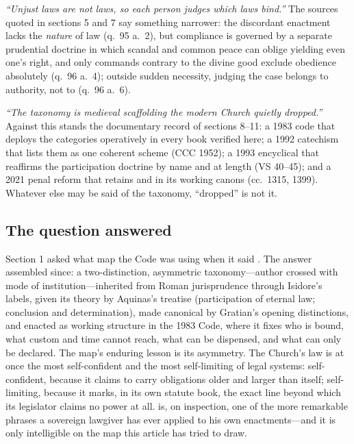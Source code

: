 \emph{``Unjust laws are not laws, so each person judges which laws bind.''} The sources quoted in sections 5 and 7 say something narrower: the discordant enactment lacks the \emph{nature} of law (q.~95 a.~2), but compliance is governed by a separate prudential doctrine in which scandal and common peace can oblige yielding even one's right, and only commands contrary to the divine good exclude obedience absolutely (q.~96 a.~4); outside sudden necessity, judging the case belongs to authority, not to  (q.~96 a.~6).

\emph{``The taxonomy is medieval scaffolding the modern Church quietly dropped.''} Against this stands the documentary record of sections 8--11: a 1983 code that deploys the categories operatively in every book verified here; a 1992 catechism that lists them as one coherent scheme (CCC 1952); a 1993 encyclical that reaffirms the participation doctrine by name and at length (VS 40--45); and a 2021 penal reform that retains  and  in its working canons (cc.~1315, 1399). Whatever else may be said of the taxonomy, ``dropped'' is not it.

\subsection{The question answered}

Section 1 asked what map the Code was using when it said . The answer assembled since: a two-distinction, asymmetric taxonomy---author crossed with mode of institution---inherited from Roman jurisprudence through Isidore's labels, given its theory by Aquinas's treatise (participation of eternal law; conclusion and determination), made canonical by Gratian's opening distinctions, and enacted as working structure in the 1983 Code, where it fixes who is bound, what custom and time cannot reach, what can be dispensed, and what can only be declared. The map's enduring lesson is its asymmetry. The Church's law is at once the most self-confident and the most self-limiting of legal systems: self-confident, because it claims to carry obligations older and larger than itself; self-limiting, because it marks, in its own statute book, the exact line beyond which its legislator claims no power at all.  is, on inspection, one of the more remarkable phrases a sovereign lawgiver has ever applied to his own enactments---and it is only intelligible on the map this article has tried to draw.
